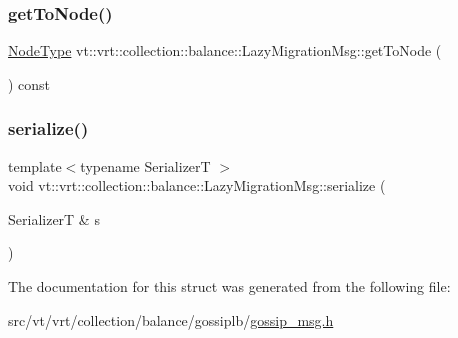 \subsubsection{\texorpdfstring{get\+To\+Node()}{getToNode()}}
{\footnotesize\ttfamily \hyperlink{namespacevt_a866da9d0efc19c0a1ce79e9e492f47e2}{Node\+Type} vt\+::vrt\+::collection\+::balance\+::\+Lazy\+Migration\+Msg\+::get\+To\+Node (\begin{DoxyParamCaption}{ }\end{DoxyParamCaption}) const\hspace{0.3cm}{\ttfamily [inline]}}

\mbox{\label{structvt_1_1vrt_1_1collection_1_1balance_1_1_lazy_migration_msg_a58b2680d2acf6ab6da98d421c21f3e20}} 
\subsubsection{\texorpdfstring{serialize()}{serialize()}}
{\footnotesize\ttfamily template$<$typename SerializerT $>$ \\
void vt\+::vrt\+::collection\+::balance\+::\+Lazy\+Migration\+Msg\+::serialize (\begin{DoxyParamCaption}\item[{SerializerT \&}]{s }\end{DoxyParamCaption})\hspace{0.3cm}{\ttfamily [inline]}}



The documentation for this struct was generated from the following file\+:\begin{DoxyCompactItemize}
\item 
src/vt/vrt/collection/balance/gossiplb/\hyperlink{gossip__msg_8h}{gossip\+\_\+msg.\+h}\end{DoxyCompactItemize}
